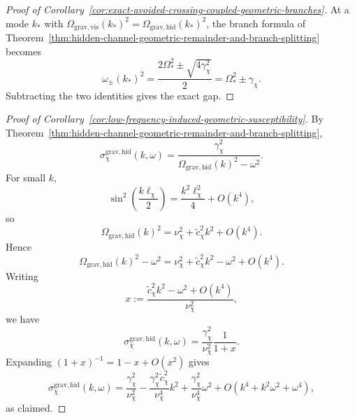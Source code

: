 \begin{proof}[Proof of Corollary~\ref{cor:exact-avoided-crossing-coupled-geometric-branches}]
\label{proof:cor:exact-avoided-crossing-coupled-geometric-branches}
At a mode \(k_\ast\) with
\(\Omega_{\mathrm{grav,vis}}(k_\ast)^2=\Omega_{\mathrm{grav,hid}}(k_\ast)^2\),
the branch formula of
Theorem~\ref{thm:hidden-channel-geometric-remainder-and-branch-splitting}
becomes
\[
\omega_{\pm}(k_\ast)^2
=
\frac{2\Omega_{\ast}^2\pm\sqrt{4\gamma_{\chi}^2}}{2}
=
\Omega_{\ast}^2\pm\gamma_{\chi}.
\]
Subtracting the two identities gives the exact gap.
\end{proof}

\begin{proof}[Proof of Corollary~\ref{cor:low-frequency-induced-geometric-susceptibility}]
\label{proof:cor:low-frequency-induced-geometric-susceptibility}
By Theorem~\ref{thm:hidden-channel-geometric-remainder-and-branch-splitting},
\[
\sigma_{\chi}^{\mathrm{grav,hid}}(k,\omega)
=
\frac{\gamma_{\chi}^2}{
\Omega_{\mathrm{grav,hid}}(k)^2-\omega^2
}.
\]
For small \(k\),
\[
\sin^2\!\left(\frac{k\ell_{\chi}}{2}\right)
=
\frac{k^2\ell_{\chi}^2}{4}+O(k^4),
\]
so
\[
\Omega_{\mathrm{grav,hid}}(k)^2
=
\nu_{\chi}^2+\widetilde c_{\chi}^2k^2+O(k^4).
\]
Hence
\[
\Omega_{\mathrm{grav,hid}}(k)^2-\omega^2
=
\nu_{\chi}^2+\widetilde c_{\chi}^2k^2-\omega^2+O(k^4).
\]
Writing
\[
x
:=
\frac{\widetilde c_{\chi}^2k^2-\omega^2+O(k^4)}{\nu_{\chi}^2},
\]
we have
\[
\sigma_{\chi}^{\mathrm{grav,hid}}(k,\omega)
=
\frac{\gamma_{\chi}^2}{\nu_{\chi}^2}\frac{1}{1+x}.
\]
Expanding \((1+x)^{-1}=1-x+O(x^2)\) gives
\[
\sigma_{\chi}^{\mathrm{grav,hid}}(k,\omega)
=
\frac{\gamma_{\chi}^2}{\nu_{\chi}^2}
-
\frac{\gamma_{\chi}^2\widetilde c_{\chi}^2}{\nu_{\chi}^4}k^2
+
\frac{\gamma_{\chi}^2}{\nu_{\chi}^4}\omega^2
+
O(k^4+k^2\omega^2+\omega^4),
\]
as claimed.
\end{proof}
